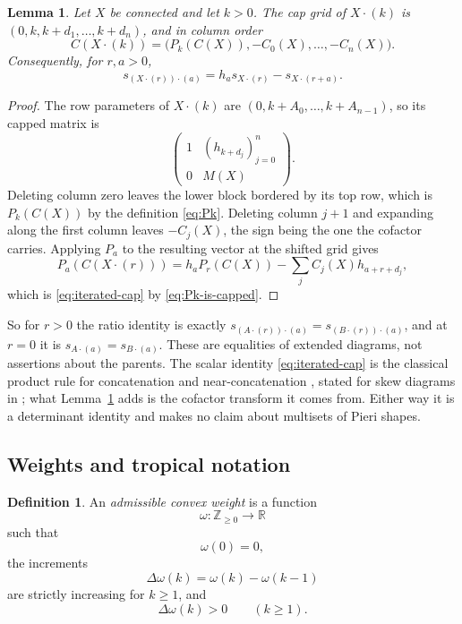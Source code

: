 \documentclass[11pt,a4paper]{amsart}
\numberwithin{equation}{section}
\theoremstyle{plain}
\newtheorem{lemma}[theorem]{Lemma}
\theoremstyle{definition}
\newtheorem{definition}[theorem]{Definition}
\newcommand{\Z}{\mathbb Z}
\newcommand{\R}{\mathbb R}
\begin{document}
\begin{lemma}\label{lem:extension-cofactors}
Let \(X\) be connected and let \(k>0\).  The cap grid of \(X\cdot(k)\) is \((0,k,k+d_1,\ldots,k+d_n)\), and in column order
\[
C(X\cdot(k))
=
\bigl(P_k(C(X)),-C_0(X),\ldots,-C_n(X)\bigr).
\]
Consequently, for \(r,a>0\),
\begin{equation}\label{eq:iterated-cap}
s_{(X\cdot(r))\cdot(a)}
=
h_as_{X\cdot(r)}-s_{X\cdot(r+a)}.
\end{equation}
\end{lemma}

\begin{proof}
The row parameters of \(X\cdot(k)\) are \((0,k+A_0,\ldots,k+A_{n-1})\), so its capped matrix is
\[
\begin{pmatrix}
1&(h_{k+d_j})_{j=0}^{n}\\
0&M(X)
\end{pmatrix}.
\]
Deleting column zero leaves the lower block bordered by its top row, which is \(P_k(C(X))\) by the definition \eqref{eq:Pk}.  Deleting column \(j+1\) and expanding along the first column leaves \(-C_j(X)\), the sign being the one the cofactor carries.  Applying \(P_a\) to the resulting vector at the shifted grid gives
\[
P_a(C(X\cdot(r)))
=
h_aP_r(C(X))-\sum_j C_j(X)h_{a+r+d_j},
\]
which is \eqref{eq:iterated-cap} by \eqref{eq:Pk-is-capped}.
\end{proof}

So for \(r>0\) the ratio identity is exactly \(s_{(A\cdot(r))\cdot(a)}=s_{(B\cdot(r))\cdot(a)}\), and at \(r=0\) it is \(s_{A\cdot(a)}=s_{B\cdot(a)}\).  These are equalities of extended diagrams, not assertions about the parents.  The scalar identity \eqref{eq:iterated-cap} is the classical product rule for concatenation and near-concatenation \cite[Ch.~I, \S5, Ex.~21(a)]{Macdonald1995SymmetricFunctions}, stated for skew diagrams in \cite[Prop.~4.1]{Reiner2007Coincidences}; what Lemma~\ref{lem:extension-cofactors} adds is the cofactor transform it comes from.  Either way it is a determinant identity and makes no claim about multisets of Pieri shapes.

\subsection{Weights and tropical notation}

\begin{definition}\label{def:convex-weight}
An \emph{admissible convex weight} is a function
\[
\omega:\Z_{\ge0}\to\R
\]
such that
\[
\omega(0)=0,
\]
the increments
\[
\Delta\omega(k)=\omega(k)-\omega(k-1)
\]
are strictly increasing for \(k\ge1\), and
\[
\Delta\omega(k)>0
\qquad(k\ge1).
\]
\end{definition}
\end{document}
